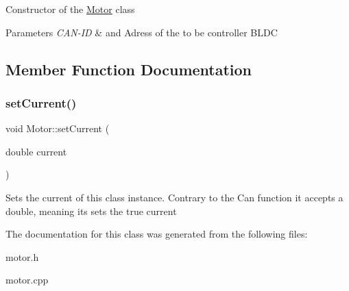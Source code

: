 Constructor of the \hyperlink{classMotor}{Motor} class 
\begin{DoxyParams}{Parameters}
{\em C\+A\+N-\/\+ID} & and Adress of the to be controller B\+L\+DC \\
\hline
\end{DoxyParams}


\subsection{Member Function Documentation}
\mbox{\label{classMotor_ac33c3799c5e7779de654a881d590986d}} 
\subsubsection{\texorpdfstring{set\+Current()}{setCurrent()}}
{\footnotesize\ttfamily void Motor\+::set\+Current (\begin{DoxyParamCaption}\item[{double}]{current }\end{DoxyParamCaption})}

Sets the current of this class instance. Contrary to the Can function it accepts a double, meaning its sets the true current 

The documentation for this class was generated from the following files\+:\begin{DoxyCompactItemize}
\item 
motor.\+h\item 
motor.\+cpp\end{DoxyCompactItemize}
